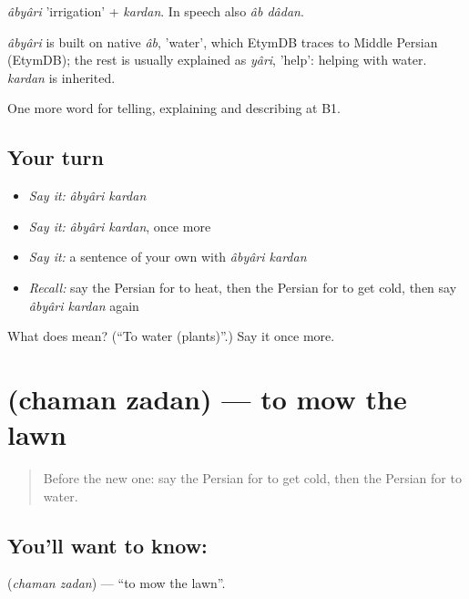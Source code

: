 \emph{âbyâri} 'irrigation' + \emph{kardan}. In speech also \emph{âb dâdan}.

\begin{cousinweb}
\emph{âbyâri} is built on native \emph{âb}, 'water', which EtymDB traces to Middle Persian (EtymDB); the rest is usually explained as \emph{yâri}, 'help': helping with water. \emph{kardan} is inherited.
\end{cousinweb}

\begin{grammarlens}[title={What you've built}]
One more word for telling, explaining and describing at B1.
\end{grammarlens}

\subsection*{Your turn}
\begin{itemize}
\raggedright
  \item \emph{Say it:} \emph{âbyâri kardan}
  \item \emph{Say it:} \emph{âbyâri kardan}, once more
  \item \emph{Say it:} a sentence of your own with \emph{âbyâri kardan}
  \item \emph{Recall:} say the Persian for to heat, then the Persian for to get cold, then say \emph{âbyâri kardan} again
\end{itemize}

\begin{tcolorbox}[breakable,colback=teal!4,colframe=teal!35!black,title={Before you move on}]
What does   mean? (\textquotedblleft{}To water (plants)\textquotedblright{}.) Say it once more.
\end{tcolorbox}
\section[\texorpdfstring{\fa{چمن} \fa{زدن} (chaman zadan)}{چمن زدن (chaman zadan)}]{  (chaman zadan) — to mow the lawn}

\label{lesson:FA-C539-chaman-zadan}



\begin{quote}
Before the new one: say the Persian for to get cold, then the Persian for to water.
\end{quote}

\subsection*{You'll want to know:  }
\textbf{ } (\emph{chaman zadan}) — \textquotedblleft{}to mow the lawn\textquotedblright{}.

